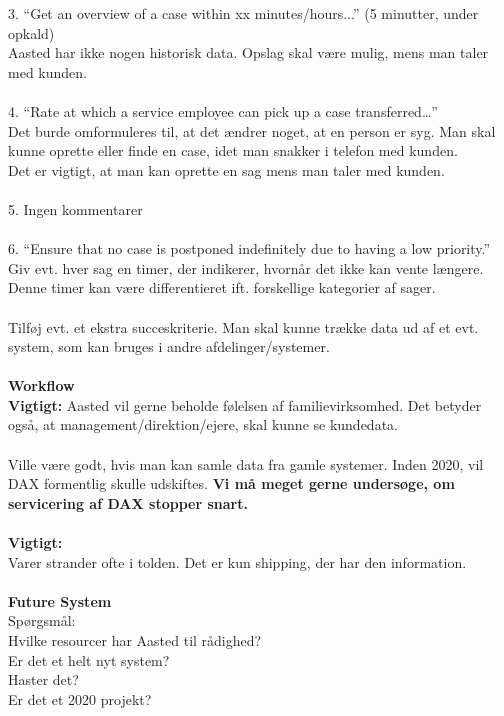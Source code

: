 3. “Get an overview of a case within xx minutes/hours...” (5 minutter, under opkald)\\
Aasted har ikke nogen historisk data. Opslag skal være mulig, mens man taler med kunden.\\\\
4. “Rate at which a service employee can pick up a case transferred…”\\
Det burde omformuleres til, at det ændrer noget, at en person er syg. Man skal kunne oprette eller finde en case, idet man snakker i telefon med kunden.\\
Det er vigtigt, at man kan oprette en sag mens man taler med kunden.\\\\
5. Ingen kommentarer\\\\
6. “Ensure that no case is postponed indefinitely due to having a low priority.”\\
Giv evt. hver sag en timer, der indikerer, hvornår det ikke kan vente længere. Denne timer kan være differentieret ift. forskellige kategorier af sager.\\\\
Tilføj evt.  et ekstra succeskriterie. Man skal kunne trække data ud af et evt. system, som kan bruges i andre afdelinger/systemer.\\\\
\textbf{Workflow}\\
\textbf{Vigtigt:} Aasted vil gerne beholde følelsen af familievirksomhed. Det betyder også, at management/direktion/ejere, skal kunne se kundedata.\\\\
Ville være godt, hvis man kan samle data fra gamle systemer. Inden 2020, vil DAX formentlig skulle udskiftes. \textbf{Vi må meget gerne undersøge, om servicering af DAX stopper snart.}\\\\
\textbf{Vigtigt:}\\
Varer strander ofte i tolden. Det er kun shipping, der har den information.
\\\\
\textbf{Future System}\\
Spørgsmål:\\
Hvilke resourcer har Aasted til rådighed?\\
Er det et helt nyt system?\\ 
Haster det?\\ 
Er det et 2020 projekt?
\\\\
